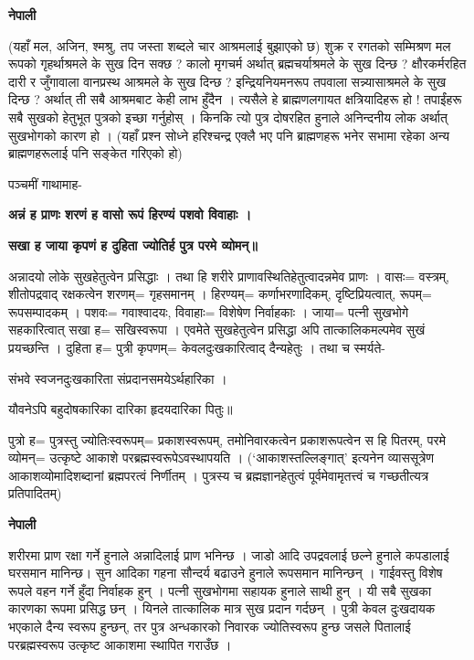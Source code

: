 \documentclass[11pt, a5paper]{article}
\begin{document}
\textbf{नेपाली}

(यहाँ मल, अजिन, श्मश्रु, तप जस्ता शब्दले चार आश्रमलाई बुझाएको छ)  शुक्र र रगतको सम्मिश्रण मल रूपको गृहर्थाश्रमले के सुख दिन सक्छ ? कालो मृगचर्म अर्थात् ब्रह्मचर्याश्रमले के सुख दिन्छ ? क्षौरकर्मरहित दारी र जुँगावाला वानप्रस्थ आश्रमले के सुख दिन्छ ? इन्द्रियनियमनरूप तपवाला सन्न्यासाश्रमले के सुख दिन्छ ? अर्थात् ती सबै आश्रमबाट केही लाभ हुँदैन । त्यसैले हे ब्राह्मणलगायत क्षत्रियादिहरू हो ! तपाईंहरू सबै सुखको हेतुभूत पुत्रको इच्छा गर्नुहोस् । किनकि त्यो पुत्र दोषरहित हुनाले अनिन्दनीय लोक अर्थात् सुखभोगको कारण हो । (यहाँ प्रश्न सोध्ने हरिश्चन्द्र एक्लै भए पनि ब्राह्मणहरू भनेर सभामा रहेका अन्य ब्राह्मणहरूलाई पनि सङ्‌केत गरिएको हो)

पञ्चमीं गाथामाह-

\textbf{अन्नं ह प्राणः शरणं ह वासो रूपं हिरण्यं पशवो विवाहाः ।}

\textbf{सखा ह जाया कृपणं ह दुहिता ज्योतिर्ह पुत्र परमे व्योमन्॥}

अन्नादयो लोके सुखहेतुत्वेन प्रसिद्धाः । तथा हि शरीरे प्राणावस्थितिहेतुत्वादन्नमेव प्राणः । वासः= वस्त्रम्, शीतोपद्रवाद् रक्षकत्वेन शरणम्= गृहसमानम् । हिरण्यम्= कर्णाभरणादिकम्, दृष्टिप्रियत्वात्, रूपम्= रूपसम्पादकम् । पशवः= गवाश्वादयः, विवाहाः= विशेषेण निर्वाहकाः । जाया= पत्नी सुखभोगे सहकारित्वात् सखा ह= सखिस्वरूपा । एवमेते सुखहेतुत्वेन प्रसिद्धा अपि तात्कालिकमल्पमेव सुखं प्रयच्छन्ति । दुहिता ह= पुत्री कृपणम्= केवलदुःखकारित्वाद् दैन्यहेतुः । तथा च स्मर्यते-

संभवे स्वजनदुःखकारिता संप्रदानसमयेऽर्थहारिका ।

यौवनेऽपि बहुदोषकारिका दारिका हृदयदारिका पितुः॥

पुत्रो ह= पुत्रस्तु ज्योतिःस्वरूपम्= प्रकाशस्वरूपम्, तमोनिवारकत्वेन प्रकाशरूपत्वेन स हि पितरम्, परमे व्योमन्= उत्कृष्टे आकाशे परब्रह्मस्वरूपेऽवस्थापयति । (‘आकाशस्तल्लिङ्‍गात्’ इत्यनेन व्याससूत्रेण आकाशव्योमादिशब्दानां ब्रह्मपरत्वं निर्णीतम् । पुत्रस्य च ब्रह्मज्ञानहेतुत्वं पूर्वमेवामृतत्त्वं च गच्छतीत्यत्र प्रतिपादितम्)

\textbf{नेपाली}

शरीरमा प्राण रक्षा गर्ने हुनाले अन्नादिलाई प्राण भनिन्छ । जाडो आदि उपद्रवलाई छल्ने हुनाले कपडालाई घरसमान मानिन्छ। सुन आदिका गहना सौन्दर्य बढाउने हुनाले रूपसमान मानिन्छन् । गाईवस्तु विशेष रूपले वहन गर्ने हुँदा निर्वाहक हुन् । पत्नी सुखभोगमा सहायक हुनाले साथी हुन् । यी सबै सुखका कारणका रूपमा प्रसिद्ध छन् । यिनले तात्कालिक मात्र सुख प्रदान गर्दछन् । पुत्री केवल दुःखदायक भएकाले दैन्य स्वरूप हुन्छन्, तर पुत्र अन्धकारको निवारक ज्योतिस्वरूप हुन्छ जसले पितालाई परब्रह्मस्वरूप उत्कृष्ट आकाशमा स्थापित गराउँछ ।
\end{document}
